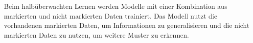 Beim halbüberwachten Lernen werden Modelle mit einer Kombination aus markierten
und nicht markierten Daten trainiert. Das Modell nutzt die vorhandenen
markierten Daten, um Informationen zu generalisieren und die nicht markierten
Daten zu nutzen, um weitere Muster zu erkennen.